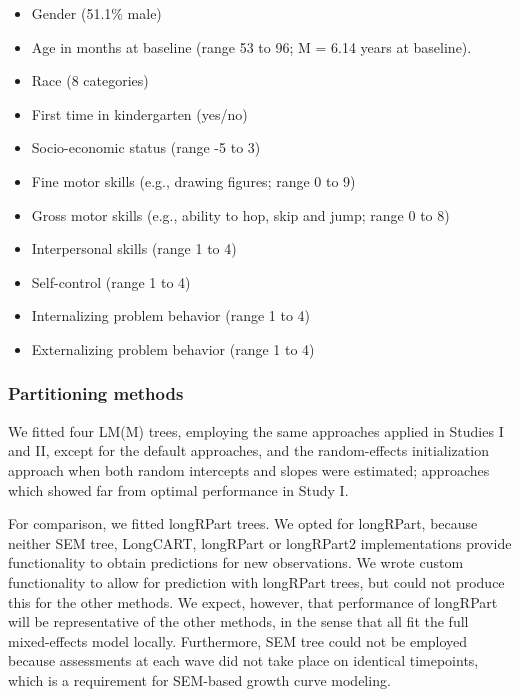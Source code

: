 \documentclass[doc,floatsintext,natbib]{apa7}
\begin{document}
\begin{itemize}
\setlength\itemsep{0em}
\setlength{\itemindent}{0.2in}
\item Gender (51.1\% male)
\item Age in months at baseline (range 53 to 96; M = 6.14 years at baseline).
\item Race (8 categories)
\item First time in kindergarten (yes/no)
\item Socio-economic status (range -5 to 3)
\item Fine motor skills (e.g., drawing figures; range 0 to 9)
\item Gross motor skills (e.g., ability to hop, skip and jump; range 0 to 8)
\item Interpersonal skills (range 1 to 4)
\item Self-control (range 1 to 4)
\item Internalizing problem behavior (range 1 to 4)
\item Externalizing problem behavior (range 1 to 4)
\end{itemize}





\subsubsection{Partitioning methods}


We fitted four LM(M) trees, employing the same approaches applied in Studies I and II, except for the default approaches, and the random-effects initialization approach when both random intercepts and slopes were estimated; approaches which showed far from optimal performance in Study I. 

For comparison, we fitted longRPart \citep{AbdoyLeBl02} trees. We opted for longRPart, because neither SEM tree, LongCART, longRPart or longRPart2 implementations provide functionality to obtain predictions for new observations. We wrote custom functionality to allow for prediction with longRPart trees, but could not produce this for the other methods. We expect, however, that performance of longRPart will be representative of the other methods, in the sense that all fit the full mixed-effects model locally. Furthermore, SEM tree could not be employed because assessments at each wave did not take place on identical timepoints, which is a requirement for SEM-based growth curve modeling.
\end{document}
